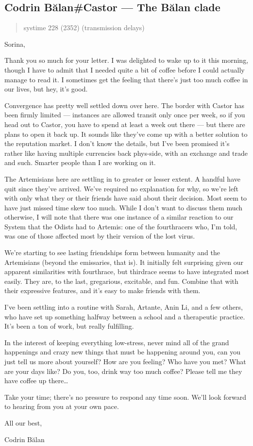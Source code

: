 \hypertarget{codrin-bux103lancastor-the-bux103lan-clade}{%
\subsection{Codrin Bălan\#Castor — The Bălan clade}\label{codrin-bux103lancastor-the-bux103lan-clade}}

\begin{quote}
systime 228 (2352) (transmission delays)
\end{quote}

Sorina,

Thank you so much for your letter. I was delighted to wake up to it this morning, though I have to admit that I needed quite a bit of coffee before I could actually manage to read it. I sometimes get the feeling that there's just too much coffee in our lives, but hey, it's good.

Convergence has pretty well settled down over here. The border with Castor has been firmly limited — instances are allowed transit only once per week, so if you head out to Castor, you have to spend at least a week out there — but there are plans to open it back up. It sounds like they've come up with a better solution to the reputation market. I don't know the details, but I've been promised it's rather like having multiple currencies back phys-side, with an exchange and trade and such. Smarter people than I are working on it.

The Artemisians here are settling in to greater or lesser extent. A handful have quit since they've arrived. We've required no explanation for why, so we're left with only what they or their friends have said about their decision. Most seem to have just missed time skew too much. While I don't want to discuss them much otherwise, I will note that there was one instance of a similar reaction to our System that the Odists had to Artemis: one of the fourthracers who, I'm told, was one of those affected most by their version of the lost virus.

We're starting to see lasting friendships form between humanity and the Artemisians (beyond the emissaries, that is). It initially felt surprising given our apparent similarities with fourthrace, but thirdrace seems to have integrated most easily. They are, to the last, gregarious, excitable, and fun. Combine that with their expressive features, and it's easy to make friends with them.

I've been settling into a routine with Sarah, Artante, Anin Li, and a few others, who have set up something halfway between a school and a therapeutic practice. It's been a ton of work, but really fulfilling.

In the interest of keeping everything low-stress, never mind all of the grand happenings and crazy new things that must be happening around you, can you just tell us more about yourself? How are you feeling? Who have you met? What are your days like? Do you, too, drink way too much coffee? Please tell me they have coffee up there\ldots{}

Take your time; there's no pressure to respond any time soon. We'll look forward to hearing from you at your own pace.

All our best,

Codrin Bălan
